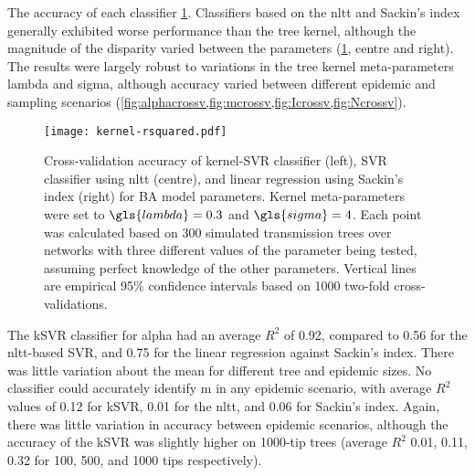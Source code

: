 The accuracy of each classifier 
 \cref{fig:rsquared}.
Classifiers based on  the \gls{nltt} and
Sackin's index generally exhibited worse performance than the tree kernel,
although the magnitude of the disparity varied between the parameters
(\cref{fig:rsquared}, centre and right). The results were largely robust to
variations in the tree kernel meta-parameters \gls{lambda} and \gls{sigma},
although accuracy varied between different epidemic and sampling scenarios
(\cref{fig:alphacrossv,fig:mcrossv,fig:Icrossv,fig:Ncrossv}). 

\begin{figure}[ht]
    \centering
    \texttt{[image: kernel-rsquared.pdf]}
    \caption[
        Cross-validation accuracy of kernel-SVR, nLTT-based SVR, and Sackin's
        index regression classifiers for BA model parameters.
    ]{
        Cross-validation accuracy of kernel-SVR classifier (left), SVR
        classifier using \gls{nltt} (centre), and linear regression using
        Sackin's index (right) for \gls{BA} model parameters. Kernel
        meta-parameters were set to $\gls{lambda} = 0.3$ and $\gls{sigma} = 4$.
        Each point was calculated based on 300 simulated transmission trees
        over networks with three different values of the parameter being
        tested, assuming perfect knowledge of the other parameters. Vertical
        lines are empirical 95\% confidence intervals based on 1000 two-fold
        cross-validations. 
    }
    \label{fig:rsquared}
\end{figure}

The \gls{kSVR} classifier for \gls{alpha} had an average $R^2$ of 
    0.92,
compared to 
    0.56
for the \gls{nltt}-based SVR, and
    0.75
for the linear regression against Sackin's index. There was little variation
about the mean for different tree and epidemic sizes. No classifier could
accurately identify \gls{m} in any epidemic scenario, with average $R^2$ values
of 
  0.12 for \gls{kSVR},
  0.01 for the \gls{nltt}, and
  0.06
for Sackin's index. Again, there was little variation in accuracy between
epidemic scenarios, although the accuracy of the \gls{kSVR} was slightly higher
on 1000-tip trees 
    (average $R^2$ 
     0.01,
     0.11,
     0.32
     for 100, 500, and 1000 tips respectively).

